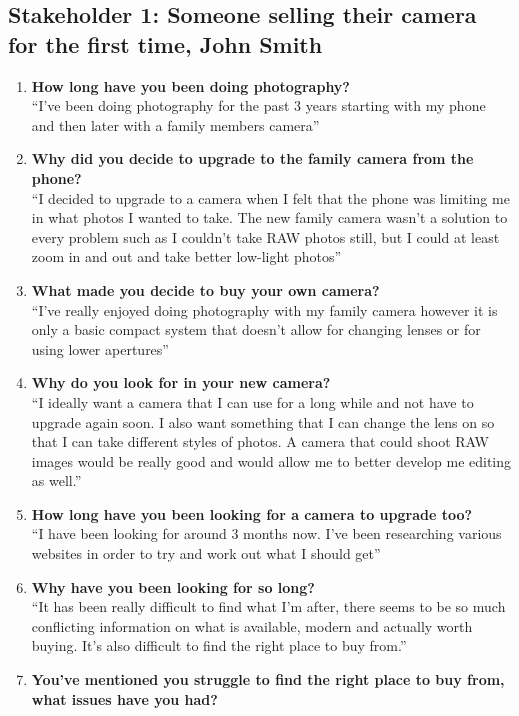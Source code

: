 \subsection{Stakeholder 1: Someone selling their camera for the first time, John Smith}
\begin{enumerate}
\item \textbf{How long have you been doing photography?} \\
“I’ve been doing photography for the past 3 years starting with my phone and then later with a family members camera”
\item \textbf{Why did you decide to upgrade to the family camera from the phone?} \\
“I decided to upgrade to a camera when I felt that the phone was limiting me in what photos I wanted to take. The new family camera wasn’t a solution to every problem such as I couldn’t take RAW photos still, but I could at least zoom in and out and take better low-light photos”
\item \textbf{What made you decide to buy your own camera?} \\
“I’ve really enjoyed doing photography with my family camera however it is only a basic compact system that doesn’t allow for changing lenses or for using lower apertures”
\item \textbf{Why do you look for in your new camera?} \\
“I ideally want a camera that I can use for a long while and not have to upgrade again soon. I also want something that I can change the lens on so that I can take different styles of photos. A camera that could shoot RAW images would be really good and would allow me to better develop me editing as well.”
\item \textbf{How long have you been looking for a camera to upgrade too?} \\
“I have been looking for around 3 months now. I’ve been researching various websites in order to try and work out what I should get”
\item \textbf{Why have you been looking for so long?} \\
“It has been really difficult to find what I’m after, there seems to be so much conflicting information on what is available, modern and actually worth buying. It’s also difficult to find the right place to buy from.”
\item \textbf{You’ve mentioned you struggle to find the right place to buy from, what issues have you had?} \\

\end{enumerate}
